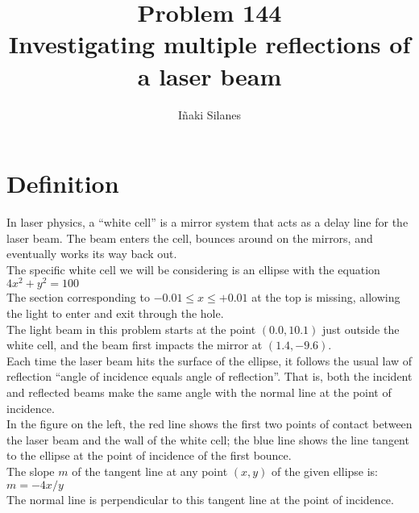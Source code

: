 \documentclass[english]{article}
\begin{document}
\newcommand{\mc}{\multicolumn}
\newcommand{\mr}{\multirow}
\newcommand{\cw}{\columnwidth}
\newcommand{\ig}[2]{\texttt{[image: \#2]}}

\title{Problem 144\\Investigating multiple reflections of a laser beam}
\author{I\~naki Silanes}
\maketitle

\section{Definition}

In laser physics, a ``white cell'' is a mirror system that acts as a delay line for the laser beam. The beam enters the cell, bounces around on the mirrors, and eventually works its way back out.\\

The specific white cell we will be considering is an ellipse with the equation $4x^2 + y^2 = 100$\\

The section corresponding to $-0.01 \leq x \leq +0.01$ at the top is missing, allowing the light to enter and exit through the hole.\\

The light beam in this problem starts at the point $(0.0,10.1)$ just outside the white cell, and the beam first impacts the mirror at $(1.4,-9.6)$.\\

Each time the laser beam hits the surface of the ellipse, it follows the usual law of reflection ``angle of incidence equals angle of reflection''. That is, both the incident and reflected beams make the same angle with the normal line at the point of incidence.\\

In the figure on the left, the red line shows the first two points of contact between the laser beam and the wall of the white cell; the blue line shows the line tangent to the ellipse at the point of incidence of the first bounce.\\

The slope $m$ of the tangent line at any point $(x,y)$ of the given ellipse is: $m = -4x/y$\\

The normal line is perpendicular to this tangent line at the point of incidence.\\
\end{document}
